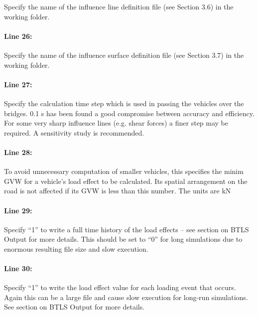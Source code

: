 \documentclass[
]{article}
\begin{document}
Specify the name of the influence line definition file (see Section 3.6)
in the working folder.

\paragraph*{Line 26:}\label{line-26}

Specify the name of the influence surface definition file (see Section
3.7) in the working folder.

\paragraph*{Line 27:}\label{line-27}

Specify the calculation time step which is used in passing the vehicles
over the bridges. 0.1 s has been found a good compromise between
accuracy and efficiency. For some very sharp influence lines (e.g. shear
forces) a finer step may be required. A sensitivity study is
recommended.

\paragraph*{Line 28:}\label{line-28}

To avoid unnecessary computation of smaller vehicles, this specifies the
minim GVW for a vehicle's load effect to be calculated. Its spatial
arrangement on the road is not affected if its GVW is less than this
number. The units are kN

\paragraph*{Line 29:}\label{line-29}

Specify ``1'' to write a full time history of the load effects -- see
section on BTLS Output for more details. This should be set to ``0'' for
long simulations due to enormous resulting file size and slow execution.

\paragraph*{Line 30:}\label{line-30}

Specify ``1'' to write the load effect value for each loading event that
occurs. Again this can be a large file and cause slow execution for
long-run simulations. See section on BTLS Output for more details.
\end{document}
